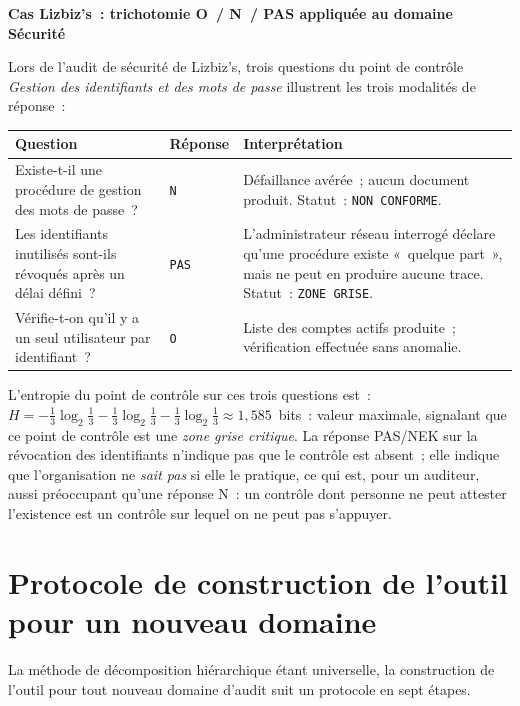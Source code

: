 \begin{boxlizbiz}
\textbf{Cas Lizbiz's~: trichotomie O~/ N~/ PAS appliquée au domaine Sécurité}

Lors de l'audit de sécurité de Lizbiz's, trois questions du point de contrôle
\emph{Gestion des identifiants et des mots de passe} illustrent les trois
modalités de réponse~:

\smallskip
\begin{tabular}{p{6.5cm}p{1.2cm}p{5cm}}
\textbf{Question} & \textbf{Réponse} & \textbf{Interprétation} \\
\midrule
Existe-t-il une procédure de gestion des mots de passe~? &
\texttt{N} &
Défaillance avérée~; aucun document produit. Statut~: \texttt{NON~CONFORME}. \\
\addlinespace
Les identifiants inutilisés sont-ils révoqués après un délai défini~? &
\texttt{PAS} &
L'administrateur réseau interrogé déclare qu'une procédure existe «~quelque
part~», mais ne peut en produire aucune trace. Statut~: \texttt{ZONE~GRISE}. \\
\addlinespace
Vérifie-t-on qu'il y a un seul utilisateur par identifiant~? &
\texttt{O} &
Liste des comptes actifs produite~; vérification effectuée sans anomalie. \\
\end{tabular}

\smallskip
L'entropie du point de contrôle sur ces trois questions est~:
$H = -\frac{1}{3}\log_2\frac{1}{3} - \frac{1}{3}\log_2\frac{1}{3}
        - \frac{1}{3}\log_2\frac{1}{3} \approx 1{,}585$~bits~: valeur maximale,
signalant que ce point de contrôle est une \emph{zone grise critique}. La
réponse PAS/NEK sur la révocation des identifiants n'indique pas que le
contrôle est absent~; elle indique que l'organisation ne \emph{sait pas} si
elle le pratique, ce qui est, pour un auditeur, aussi préoccupant qu'une
réponse N~: un contrôle dont personne ne peut attester l'existence est un
contrôle sur lequel on ne peut pas s'appuyer.
\end{boxlizbiz}

\section{Protocole de construction de l'outil pour un nouveau domaine}
\label{sec:protocole}

La méthode de décomposition hiérarchique étant universelle, la construction de
l'outil pour tout nouveau domaine d'audit suit un protocole en sept étapes.

